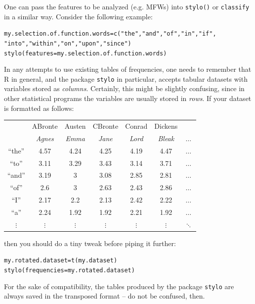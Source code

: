 \documentclass[11pt,a4paper]{article}
\def\code#1{{\tt #1}}
\begin{document}
One can pass the features to be analyzed (e.g. MFWs) into \code{stylo()} or \code{classify} in a similar way. Consider the following example:

\begin{alltt}
     my.selection.of.function.words = c("the", "and", "of", "in", "if", 
                "into", "within", "on", "upon", "since")
     stylo(features = my.selection.of.function.words)
\end{alltt}

In any attempts to use existing tables of frequencies, one needs to remember that R in general, and the package \code{stylo} in particular, accepts tabular datasets with variables stored as \textit{columns}. Certainly, this might be slightly confusing, since in other statistical programs the variables are usually stored in \textit{rows}. If your dataset is formatted as follows:

\begin{center}
\begin{tabular}{c|cccccc}
 & ABronte & Austen & CBronte & Conrad & Dickens &  \\
 & {\it Agnes} & {\it Emma} & {\it Jane} & {\it Lord} & {\it Bleak} & $\dots$\\
\hline
“the”	& 4.57	& 4.24	& 4.25	& 4.19	& 4.47  & $\dots$\\
“to”	& 3.11	& 3.29	& 3.43	& 3.14	& 3.71  & $\dots$\\
“and”	& 3.19	& 3	    & 3.08	& 2.85	& 2.81  & $\dots$\\
“of”	& 2.6	& 3	    & 2.63	& 2.43	& 2.86  & $\dots$\\
“I”    & 2.17	& 2.2	& 2.13	& 2.42	& 2.22  & $\dots$\\
“a”    & 2.24	& 1.92	& 1.92	& 2.21	& 1.92  & $\dots$\\
$\vdots$ & $\vdots$ & $\vdots$ & $\vdots$ & $\vdots$ & 
$\vdots$ & $\ddots$ 
\end{tabular}
\end{center}

\noindent
then you should do a tiny tweak before piping it further:

\begin{alltt}
    my.rotated.dataset = t(my.dataset)
    stylo(frequencies = my.rotated.dataset)
\end{alltt}

\noindent
For the sake of compatibility, the tables produced by the package \code{stylo} are always saved in the transposed format -- do not be confused, then.
\end{document}
